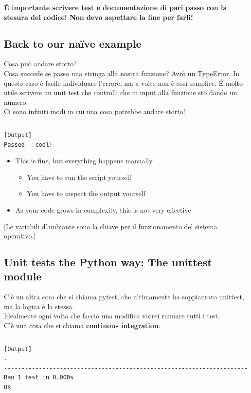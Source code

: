 \textbf{\'E importante scrivere test e documentazione di pari passo con la stesura del codice! Non devo aspettare la fine per farli!}

\subsection{Back to our na\"ive example}

Cosa può andare storto?\\
Cosa succede se passo una stringa alla nostra funzione? Avrò un TypeError. In questo caso è facile individuare l'errore, ma a volte non è così semplice. \'E molto utile scrivere un unit test che controlli che in input alla funzione sto dando un numero.\\
Ci sono infiniti modi in cui una cosa potrebbe andare storto!
\inputminted{python}{snippets/unit_test_naive.py}

\begin{verbatim}
[Output]
Passed---cool!
\end{verbatim} 

  \begin{itemize}    
  \item This is fine, but everything happens manually
    \begin{itemize}
    \item You have to run the script yourself
    \item You have to inspect the output yourself
    \end{itemize}
  \item As your code grows in complexity, this is not very effective
  \end{itemize}

[Le variabili d'ambiante sono la chiave per il funzionamento del sistema operativo.]

\subsection{Unit tests the Python way: The unittest module}

C'è un altra cosa che si chiama pytest, che ultimamente ha soppiantato unittest, ma la logica è la stessa.\\
Idealmente ogni volta che faccio una modifica vorrei runnare tutti i test.\\
C'è una cosa che si chiama \textbf{continous integration}.
\inputminted{python}{snippets/unit_test.py}

\begin{verbatim}
[Output]
.
----------------------------------------------------------------------
Ran 1 test in 0.000s
OK
\end{verbatim} 

